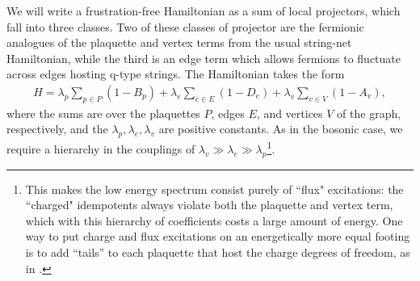 \documentclass[12pt,a4paper]{article}
\newcounter{arrow}
\newcommand{\mcz}{\mathcal{Z}}
\newcommand{\kw}[1]{{\color{kwcolor}\footnotesize{(KW) #1}}}
\newcommand{\dave}[1]{{\color{ao(english)}\footnotesize{(DA) #1}}}
\begin{document}
We will write a frustration-free Hamiltonian as a sum of local projectors, which fall into
three classes.
Two of these classes of projector are the fermionic analogues of the plaquette and vertex terms from the usual string-net Hamiltonian, 
while the third is an edge term which allows fermions to fluctuate across edges hosting q-type strings.
The Hamiltonian takes the form
\begin{align} \label{ham}
H = \lambda_p \sum_{p \in P} (1-B_p) + \lambda_e \sum_{e \in E} (1-D_e) + \lambda_v \sum_{v \in V} (1-A_v),
\end{align}
where the sums are over the plaquettes $P$, edges $E$, and vertices $V$ of the graph, respectively, and the $\lambda_p,\lambda_e,\lambda_v$ are positive constants.
As in the bosonic case, we require a hierarchy in the couplings of $\lambda_v \gg \lambda_e \gg \lambda_p$\footnote{This makes the low energy spectrum consist purely of ``flux" excitations: 
the ``charged" idempotents always violate both the plaquette and vertex term, which with this hierarchy of coefficients costs a large amount of energy. 
One way to put charge and flux excitations on an energetically more equal footing is to add ``tails'' to each 
plaquette that host the charge degrees of freedom, as in \cite{hu2015}.}.
\end{document}
